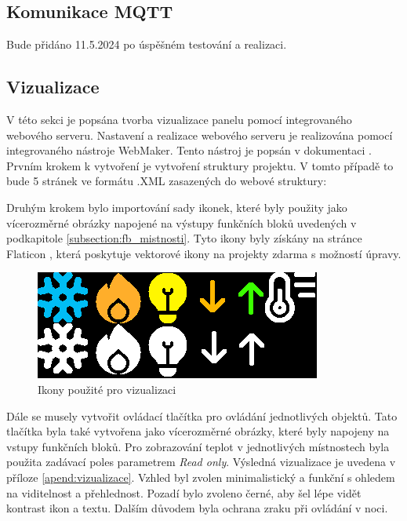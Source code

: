\subsection{Komunikace MQTT}
Bude přidáno  11.5.2024 po úspěšném testování a realizaci.
\subsection{Vizualizace}
V této sekci je popsána tvorba vizualizace panelu pomocí integrovaného webového serveru. Nastavení a realizace webového serveru je realizována pomocí integrovaného nástroje WebMaker. Tento nástroj je popsán v dokumentaci \cite{WebMaker}.
Prvním krokem k vytvoření je vytvoření struktury projektu. V tomto případě to bude 5 stránek ve formátu .XML zasazených do webové struktury: \newline

\vspace{0.3cm}
Druhým krokem bylo importování sady ikonek, které byly použity jako vícerozměrné obrázky napojené na výstupy funkčních bloků uvedených v podkapitole \ref{subsection:fb_mistnosti}. Tyto ikony byly získány na stránce Flaticon \cite{Flaticon}, která poskytuje vektorové ikony na projekty zdarma s možností úpravy. 


\begin{figure}[!ht]
    \begin{center}
        \includegraphics[scale=0.6]{obrazky/Ikonky.png}
    \end{center}
    \caption[Ikony použité pro vizualizaci]{Ikony použité pro vizualizaci}
    \label{fig:ikony}
\end{figure}

Dále se musely vytvořit ovládací tlačítka pro ovládání jednotlivých objektů. Tato tlačítka byla také vytvořena jako vícerozměrné obrázky, které byly napojeny na vstupy funkčních bloků. Pro zobrazování teplot v jednotlivých místnostech byla použita zadávací poles parametrem \textit{Read only}. 
Výsledná vizualizace je uvedena v příloze \ref{apend:vizualizace}. Vzhled byl zvolen minimalistický a funkční s ohledem na viditelnost a přehlednost. Pozadí bylo zvoleno černé, aby šel lépe vidět kontrast ikon a textu. Dalším důvodem byla ochrana zraku při ovládání v noci.